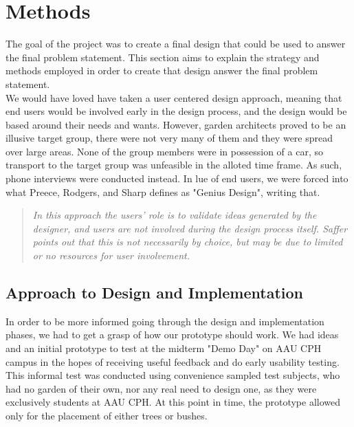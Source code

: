 \chapter{Methods}
The goal of the project was to create a final design that could be used to answer the final problem statement. This section aims to explain the strategy and methods employed in order to create that design answer the final problem statement.\\

We would have loved have taken a user centered design approach, meaning that end users would be involved early in the design process, and the design would be based around their needs and wants. However, garden architects proved to be an illusive target group, there were not very many of them and they were spread over large areas. None of the group members were in possession of a car, so transport to the target group was unfeasible in the alloted time frame. As such, phone interviews were conducted instead. In lue of end users, we were forced into what Preece, Rodgers, and Sharp defines as "Genius Design"\cite[p.~346]{interactionDesign}, writing that.\\
	\begin{quote}
	\textit{In this approach the users’ role is to validate ideas generated by the designer, and users are not involved during the design process itself. Saffer points out that this is not necessarily by choice, but may be due to limited or no resources for user involvement.}\\
	\end{quote}

 
\section{Approach to Design and Implementation}

In order to be more informed going through the design and implementation phases, we had to get a grasp of how our prototype should work. We had ideas and an initial prototype to test at the midterm "Demo Day" on AAU CPH campus in the hopes of receiving useful feedback and do early usability testing. This informal test was conducted using convenience sampled test subjects, who had no garden of their own, nor any real need to design one, as they were exclusively students at AAU CPH. At this point in time, the prototype allowed only for the placement of either trees or bushes.\\

